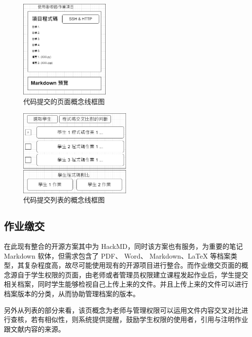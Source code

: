 \begin{figure}[htb]
\centering 
\includegraphics[width=0.40\textwidth]{img/ch1m8.png} 
\caption{代码提交的页面概念线框图}
\label{Test}
\end{figure}
\begin{figure}[htb]
\centering 
\includegraphics[width=0.50\textwidth]{img/ch1m7.png} 
\caption{代码提交列表的概念线框图}
\label{Test}
\end{figure}

\subsection{作业缴交}

在此现有整合的开源方案其中为 HackMD，同时该方案也有服务，为重要的笔记 Markdown 软体，但需求包含了 PDF、 Word、 Markdown、LaTeX 等档案类型，其复杂程度高，故尽可能使用现有的开源项目进行整合。而作业缴交页面的概念源自于学生权限的页面，由老师或者管理员权限建立课程发起作业后，学生提交相关档案，同时学生能够检视自己上传上来的文件。并且上传上来的文件可以进行档案版本的分类，从而协助管理档案的版本。

另外从列表的部分来看，该页概念为老师与管理权限可以运用文件内容交叉对比进行查核，若有相似性，则系统提供提醒，鼓励学生权限的使用者，引用与注明作业跟文献内容的来源。

